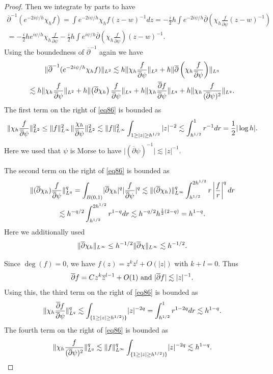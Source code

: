 \documentclass[12pt]{amsart}
\def\p{\partial}
\DeclarePairedDelimiter\norm{\lVert}{\rVert}
\theoremstyle{definition}
\theoremstyle{remark}
\newcommand{\abs}[1]{\lvert #1 \rvert}
\newcommand{\s}{\hspace{0.5pt}}
\newcommand{\op}{\overline \p}
\begin{document}
\begin{proof}
Then we integrate by parts to have
\begin{multline*}
 \op^{-1} (e^{-2i\psi/h} \chi_h f)=\int e^{-2i\psi/h}\chi_h f(z-w)^{-1}dz=-\frac{i}{2}h\int e^{-2i\psi/h}\op\left(\chi_h\frac{f}{\op \psi}(z-w)^{-1}\right) \\
 =-\frac{i}{2}h e^{i\psi/h} \chi_h\frac{f}{\op \psi}-\frac{i}{2}h\int e^{i\psi/h}\op \left(\chi_h\frac{f}{\op \psi}\right)(z-w)^{-1}.
\end{multline*}
Using the boundedness of $\op^{-1}$ again we have
\begin{multline}\label{eq86}
 \norm{\op^{-1} (e^{-2i\psi/h} \chi_h f )}_{L^2}\lesssim h\norm{\chi_h\frac{f}{\op \psi}}_{L^2}+h\norm{\op \left(\chi_h\frac{f}{\op \psi}\right)}_{L^q}\\
 \lesssim h\norm{\chi_h\frac{f}{\op \psi}}_{L^2}+h\norm{\left(\op \chi_h\right)\frac{f}{\op \psi}}_{L^q} +h\norm{\chi_h\frac{\op f}{\op \psi}}_{L^q}+h\norm{\chi_h\frac{f}{(\op \psi)^2}}_{L^q}.
\end{multline}
The first term on the right of \eqref{eq86} is bounded as
\[
 \norm{\chi_h\frac{f}{\op \psi}}_{L^2}^2\leq \norm{f}_{L^\infty}^2\norm{\frac{\chi_h}{\op\psi}}_{L^2}^2\lesssim \norm{f}_{L^\infty}^2\int_{1\geq|z|\geq h^{1/2}}|z|^{-2}\lesssim \int_{h^{1/2}}^1r^{-1} dr=\frac{1}{2}|\log h|.
\]
Here we used that $\psi$ is Morse to have $\abs{(\op \psi)^{-1}}\lesssim \abs{z}^{-1}$.

The second term on the right of \eqref{eq86} is bounded as
\begin{multline*}
 \norm{(\op\chi_h)\frac{f}{\op \psi}}_{L^q}^q=\int_{B(0,1)} \abs{\op\chi_h}^q\abs{\frac{f}{\op \psi}}^q\lesssim \norm{(\op \chi_h)}_{L^\infty}^q\int_{h^{1/2}}^{2h^{1/2}} r\left|\frac{f}{r}\right|^q dr \\
 \lesssim h^{-q/2} \int_{h^{1/2}}^{2h^{1/2}} r^{1-q}dr \lesssim h^{-q/2}h^{\frac{1}{2}(2-q)}=h^{1-q}.
\end{multline*}
Here we additionally used  
\[
 \norm{\op \chi_h}_{L^\infty}\leq h^{-1/2}\norm{\op \chi}_{L^\infty}\lesssim h^{-1/2}.
\]

% 

Since $\deg(f)=0$, we have $f(z)=z^k\overline z^l+O(\abs{z})$ with $k+l=0$. Thus
\[
 \op f= C\s z^k\overline z^{l-1} + O(1) \text{ and } \abs{\op f}\lesssim \abs{z}^{-1}.
\]
Using this, the third term on the right of \eqref{eq86} is bounded as 
\begin{equation}\label{eq:log_estimate}
 \norm{\chi_h\frac{\op f}{\op \psi}}_{L^q}^q
\lesssim \int_{\{1\geq\abs{z}\geq h^{1/2})\}} \abs{z}^{-2q}
 =  \int_{h^{1/2}}^1  r^{1-2q}dr\lesssim h^{1-q}.
\end{equation}
The fourth term on the right of \eqref{eq86} is bounded as
\begin{equation*}
 \norm{\chi_h\frac{f}{(\op \psi)^2}}_{L^q}^q\lesssim \norm{f}_{L^\infty}^q\int_{\{1\geq\abs{z}\geq h^{1/2})\}} \abs{z}^{-2q} \lesssim h^{1-q}.
\end{equation*}


\end{proof}
\end{document}
